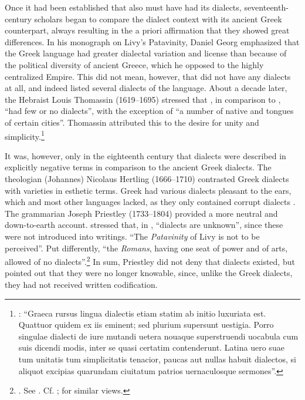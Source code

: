 Once it had been established that  also must have had its dialects, seven\-teenth-century scholars began to compare the  dialect context with its ancient Greek counterpart, always resulting in the a priori affirmation that they showed great differences. In his monograph on Livy’s Patavinity, Daniel Georg \citet[146]{Morhof1685} emphasized that the Greek language had greater dialectal variation and license than  because of the political diversity of ancient Greece, which he opposed to the highly centralized  Empire. This did not mean, however, that  did not have any dialects at all, and \citet[148--149]{Morhof1685} indeed listed several dialects of the language. About a decade later, the Hebraist Louis Thomassin (1619–1695) stressed that , in comparison to , “had few or no dialects”, with the exception of “a number of native and  tongues of certain cities”. Thomassin attributed this to the  desire for unity and simplicity.\footnote{\citet[xix]{Thomassin1697}: “Graeca rursus lingua dialectis etiam statim ab initio luxuriata est. Quattuor quidem ex iis eminent; sed plurium supersunt uestigia. Porro singulae dialecti de iure mutandi uetera nouaque superstruendi uocabula cum suis dicendi modis, inter se quasi certatim contenderunt. Latina uero suae tum unitatis tum simplicitatis tenacior, paucas aut nullas habuit dialectos, si aliquot excipias quarundam ciuitatum patrios uernaculosque sermones”.}

It was, however, only in the eighteenth century that  dialects were described in explicitly negative terms in comparison to the ancient Greek dialects. The  theologian (Johannes) Nicolaus Hertling (1666–1710) contrasted Greek dialects with  varieties in esthetic terms. Greek had various dialects pleasant to the ears, which  and most other languages lacked, as they only contained corrupt dialects \citep[73]{Hertling1708}. The  grammarian Joseph Priestley (1733–1804) provided a more neutral and down-to-earth account. \citet[138]{Priestley1762} stressed that, in , “dialects are unknown”, since these were not introduced into writings. “The \textit{Patavinity} of Livy is not to be perceived”. Put differently, “the \textit{Romans}, having one seat of power and of arts, allowed of no dialects”.\footnote{\citet[280]{Priestley1762}. See \citet[52]{Amsler1993}. Cf. \citet[49]{Galiani1779}; \citet[203--205]{Ries1786} for similar views.} In sum, Priestley did not deny that  dialects existed, but pointed out that they were no longer knowable, since, unlike the Greek dialects, they had not received written codification.

